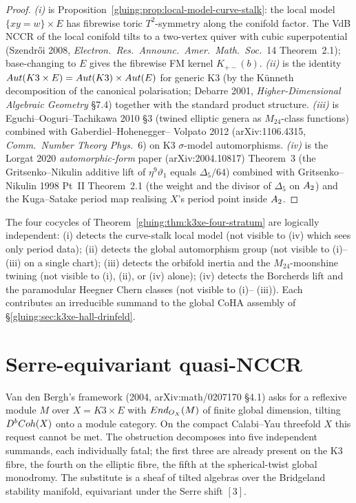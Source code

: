 \begin{proof}
\emph{(i)} is Proposition~\ref{gluing:prop:local-model-curve-stalk}: the local
model $\{xy = w\} \times E$ has fibrewise toric $T^2$-symmetry
along the conifold factor. The VdB NCCR of the local conifold tilts
to a two-vertex quiver with cubic superpotential (Szendr\H{o}i 2008,
\emph{Electron.\ Res.\ Announc.\ Amer.\ Math.\ Soc.}~14 Theorem~2.1);
base-changing to $E$ gives the fibrewise FM kernel
$K_{+-}(b)$. \emph{(ii)} is the identity $Aut(K3 \times E) =
Aut(K3) \times Aut(E)$ for generic K3 (by the K\"unneth decomposition
of the canonical polarisation; Debarre 2001, \emph{Higher-Dimensional
Algebraic Geometry} \S 7.4) together with the standard product structure.
\emph{(iii)} is Eguchi--Ooguri--Tachikawa 2010 \S 3 (twined elliptic
genera as $M_{24}$-class functions) combined with Gaberdiel--Hohenegger--
Volpato 2012 (arXiv:1106.4315, \emph{Comm.\ Number Theory Phys.}~6)
on K3 $\sigma$-model automorphisms. \emph{(iv)} is the Lorgat 2020
\emph{automorphic-form} paper (arXiv:2004.10817) Theorem~3
(the Gritsenko--Nikulin additive lift of $\eta^9 \vartheta_1$ equals
$\Delta_5 / 64$) combined with Gritsenko--Nikulin 1998 Pt~II
Theorem~2.1 (the weight and the divisor of $\Delta_5$ on
$A_2$) and the Kuga--Satake period map realising
$X$'s period point inside $A_2$.
\end{proof}

\begin{remark}
\label{gluing:rem:cocycle-independence}
The four cocycles of Theorem~\ref{gluing:thm:k3xe-four-stratum} are
logically independent: (i) detects the curve-stalk local model (not
visible to (iv) which sees only period data); (ii) detects the global
automorphism group (not visible to (i)--(iii) on a single chart);
(iii) detects the orbifold inertia and the $M_{24}$-moonshine twining
(not visible to (i), (ii), or (iv) alone); (iv) detects the Borcherds
lift and the paramodular Heegner Chern classes (not visible to (i)--
(iii)). Each contributes an irreducible summand to the global CoHA
assembly of \S\ref{gluing:sec:k3xe-hall-drinfeld}.
\end{remark}

\section{Serre-equivariant quasi-NCCR}
\label{gluing:sec:k3xe-quasi-nccr}

Van den Bergh's framework (2004, arXiv:math/0207170 \S 4.1) asks for
a reflexive module $M$ over $X = K3 \times E$ with $End_{O_X}(M)$
of finite global dimension, tilting $D^bCoh(X)$ onto a module
category. On the compact Calabi--Yau threefold $X$ this request
cannot be met. The obstruction decomposes into five independent
summands, each individually fatal; the first three are already
present on the K3 fibre, the fourth on the elliptic fibre, the fifth
at the spherical-twist global monodromy. The substitute is a sheaf
of tilted algebras over the Bridgeland stability manifold, equivariant
under the Serre shift $[3]$.

